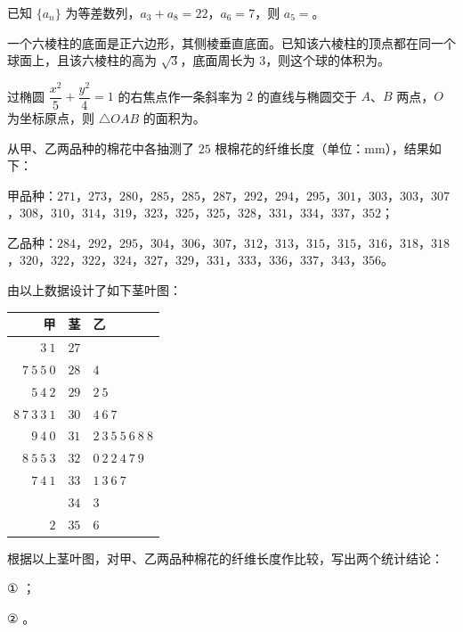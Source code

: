 \begin{question}
已知 $\{a_n\}$ 为等差数列，$a_3+a_8=22$，$a_6=7$，则 $a_5=$\gkblank{}。

\end{question}
\begin{question}
一个六棱柱的底面是正六边形，其侧棱垂直底面。已知该六棱柱的顶点都在同一个球面上，且该六棱柱的高为 $\sqrt3$，底面周长为 $3$，则这个球的体积为\gkblank{}。

\end{question}
\begin{question}
过椭圆 $\dfrac{x^2}5+\dfrac{y^2}4=1$ 的右焦点作一条斜率为 $2$ 的直线与椭圆交于 $A$、$B$ 两点，$O$ 为坐标原点，则 $\triangle OAB$ 的面积为\gkblank{}。

\end{question}
\begin{question}
从甲、乙两品种的棉花中各抽测了 $25$ 根棉花的纤维长度（单位：mm），结果如下：

甲品种：$271$，$273$，$280$，$285$，$285$，$287$，$292$，$294$，$295$，$301$，$303$，$303$，$307$，$308$，$310$，$314$，$319$，$323$，$325$，$325$，$328$，$331$，$334$，$337$，$352$；

乙品种：$284$，$292$，$295$，$304$，$306$，$307$，$312$，$313$，$315$，$315$，$316$，$318$，$318$，$320$，$322$，$322$，$324$，$327$，$329$，$331$，$333$，$336$，$337$，$343$，$356$。

由以上数据设计了如下茎叶图：

\begin{center}
\begin{tabular}{rcl}
\toprule
甲 & 茎 & 乙 \\
\midrule
$3\ 1$ & $27$ &  \\
$7\ 5\ 5\ 0$ & $28$ & $4$ \\
$5\ 4\ 2$ & $29$ & $2\ 5$ \\
$8\ 7\ 3\ 3\ 1$ & $30$ & $4\ 6\ 7$ \\
$9\ 4\ 0$ & $31$ & $2\ 3\ 5\ 5\ 6\ 8\ 8$ \\
$8\ 5\ 5\ 3$ & $32$ & $0\ 2\ 2\ 4\ 7\ 9$ \\
$7\ 4\ 1$ & $33$ & $1\ 3\ 6\ 7$ \\
 & $34$ & $3$ \\
$2$ & $35$ & $6$ \\
\bottomrule
\end{tabular}
\end{center}

根据以上茎叶图，对甲、乙两品种棉花的纤维长度作比较，写出两个统计结论：

① \gkblank{}；

② \gkblank{}。

\end{question}

